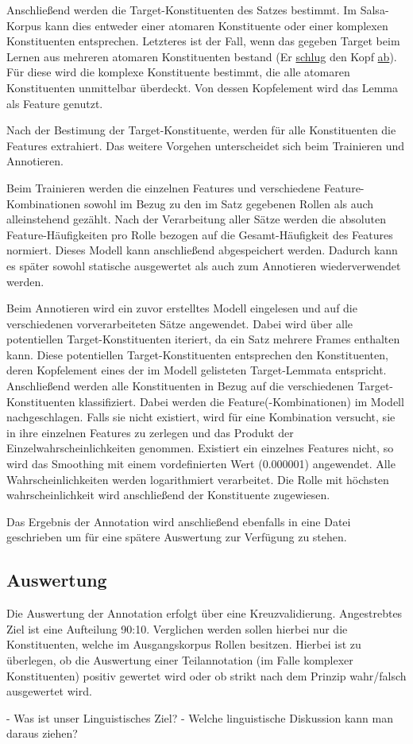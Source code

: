 \documentclass[12pt]{article}
\begin{document}
Anschließend werden die Target-Konstituenten des Satzes bestimmt. Im
Salsa-Korpus kann dies entweder einer atomaren Konstituente oder einer komplexen
Konstituenten entsprechen. Letzteres ist der Fall, wenn das gegeben Target beim
Lernen aus mehreren atomaren Konstituenten bestand (\glqq{}Er \uline{schlug} den
Kopf \uline{ab}\grqq{}). Für diese wird die komplexe Konstituente bestimmt, die
alle atomaren Konstituenten unmittelbar überdeckt. Von dessen Kopfelement wird
das Lemma als Feature genutzt.

Nach der Bestimung der Target-Konstituente, werden für alle Konstituenten die
Features extrahiert. Das weitere Vorgehen unterscheidet sich beim Trainieren und
Annotieren.

Beim Trainieren werden die einzelnen Features und verschiedene
Feature-Kombinationen sowohl im Bezug zu den im Satz gegebenen
Rollen als auch alleinstehend gezählt. Nach der Verarbeitung aller Sätze werden die absoluten
Feature-Häufigkeiten pro Rolle bezogen auf die Gesamt-Häufigkeit des Features
normiert. Dieses Modell kann anschließend abgespeichert werden. Dadurch kann es
später sowohl statische ausgewertet als auch zum Annotieren wiederverwendet
werden.

Beim Annotieren wird ein zuvor erstelltes Modell eingelesen und auf die
verschiedenen vorverarbeiteten Sätze angewendet. Dabei wird über alle
potentiellen Target-Konstituenten iteriert, da ein Satz mehrere Frames enthalten
kann. Diese potentiellen Target-Konstituenten entsprechen den Konstituenten,
deren Kopfelement eines der im Modell gelisteten Target-Lemmata entspricht.
Anschließend werden alle Konstituenten in Bezug auf die verschiedenen
Target-Konstituenten klassifiziert. Dabei werden die Feature(-Kombinationen) im
Modell nachgeschlagen. Falls sie nicht existiert, wird für eine Kombination
versucht, sie in ihre einzelnen Features zu zerlegen und das Produkt
der Einzelwahrscheinlichkeiten genommen. Existiert ein einzelnes Features nicht, so
wird das Smoothing mit einem vordefinierten Wert (0.000001) angewendet. Alle
Wahrscheinlichkeiten werden logarithmiert verarbeitet. Die Rolle mit höchsten
wahrscheinlichkeit wird anschließend der Konstituente zugewiesen.

Das Ergebnis der Annotation wird anschließend ebenfalls in eine Datei
geschrieben um für eine spätere Auswertung zur Verfügung zu stehen.

\subsection{Auswertung}

Die Auswertung der Annotation erfolgt über eine Kreuzvalidierung. Angestrebtes
Ziel ist eine Aufteilung 90:10. Verglichen werden sollen hierbei nur die
Konstituenten, welche im Ausgangskorpus Rollen besitzen. Hierbei ist zu
überlegen, ob die Auswertung einer Teilannotation (im Falle komplexer Konstituenten)
positiv gewertet wird oder ob strikt nach dem Prinzip \glqq{}wahr/falsch\grqq{}
ausgewertet wird.

 - Was ist unser Linguistisches Ziel?
 - Welche linguistische Diskussion kann man daraus ziehen?


\end{document}
